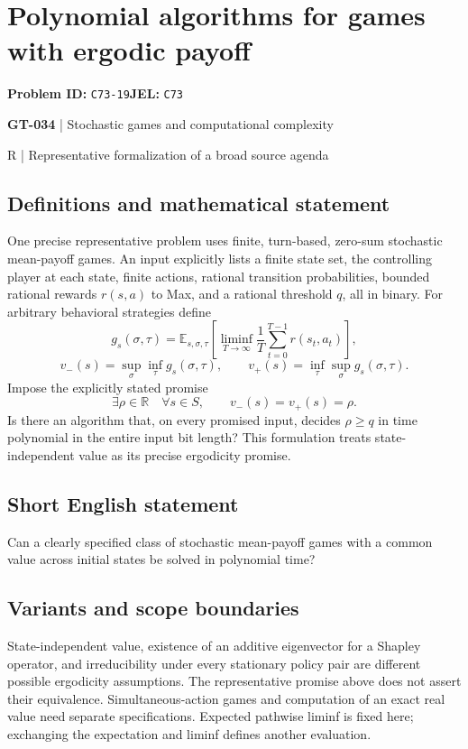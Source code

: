 \documentclass[11pt,a4paper]{article}
\begin{document}
\section*{Polynomial algorithms for games with ergodic payoff}
\textbf{Problem ID:} \texttt{C73-19}\quad \textbf{JEL:} \texttt{C73}\par
\label{problem:OP-0164}
\label{game:GT-034}
{\sffamily\small\color{muted}
{\sffamily\small\color{muted}\textbf{GT-034} | Stochastic games and computational complexity\par R | Representative formalization of a broad source agenda\par}
\par}
\subsection*{Definitions and mathematical statement}
One precise representative problem uses finite, turn-based, zero-sum stochastic mean-payoff games. An input explicitly lists a finite state set, the controlling player at each state, finite actions, rational transition probabilities, bounded rational rewards $r(s,a)$ to Max, and a rational threshold $q$, all in binary. For arbitrary behavioral strategies define
\[
 g_s(\sigma,\tau)=\mathbb E_{s,\sigma,\tau}
 \left[\liminf_{T\to\infty}\frac1T\sum_{t=0}^{T-1}r(s_t,a_t)\right],
\]
\[
 v_-(s)=\sup_\sigma\inf_\tau g_s(\sigma,\tau),
 \qquad v_+(s)=\inf_\tau\sup_\sigma g_s(\sigma,\tau).
\]
Impose the explicitly stated promise
\[
 \exists\rho\in\mathbb R\quad\forall s\in S,\qquad
 v_-(s)=v_+(s)=\rho.
\]
Is there an algorithm that, on every promised input, decides $\rho\geq q$ in time polynomial in the entire input bit length? This formulation treats state-independent value as its precise ergodicity promise.
\subsection*{Short English statement}
Can a clearly specified class of stochastic mean-payoff games with a common value across initial states be solved in polynomial time?
\subsection*{Variants and scope boundaries}
State-independent value, existence of an additive eigenvector for a Shapley operator, and irreducibility under every stationary policy pair are different possible ergodicity assumptions. The representative promise above does not assert their equivalence. Simultaneous-action games and computation of an exact real value need separate specifications. Expected pathwise liminf is fixed here; exchanging the expectation and liminf defines another evaluation.
\end{document}
